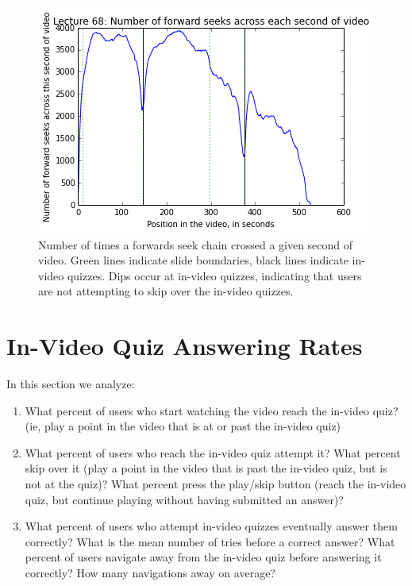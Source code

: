 \documentclass[letterpaper]{article}
\begin{document}
\begin{figure}
\includegraphics[width=1.0\columnwidth]{fwdseek13}
\caption{Number of times a forwards seek chain crossed a given second of video. Green lines indicate slide boundaries, black lines indicate in-video quizzes. Dips occur at in-video quizzes, indicating that users are not attempting to skip over the in-video quizzes.}
\label{fig:fwdseek13}
\end{figure}

\section{In-Video Quiz Answering Rates}

In this section we analyze:

\begin{enumerate}
\item What percent of users who start watching the video reach the in-video quiz? (ie, play a point in the video that is at or past the in-video quiz)
\item What percent of users who reach the in-video quiz attempt it? What percent skip over it (play a point in the video that is past the in-video quiz, but is not at the quiz)? What percent press the play/skip button (reach the in-video quiz, but continue playing without having submitted an answer)?
\item What percent of users who attempt in-video quizzes eventually answer them correctly? What is the mean number of tries before a correct answer? What percent of users navigate away from the in-video quiz before answering it correctly? How many navigations away on average?
\end{enumerate}
\end{document}
